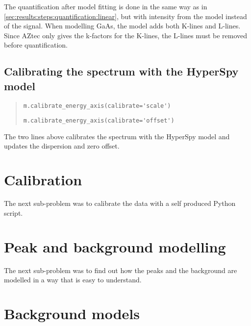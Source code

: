 The quantification after model fitting is done in the same way as in \cref{sec:results:steps:quantification:linear}, but with intensity from the model instead of the signal.
When modelling GaAs, the model adds both K-lines and L-lines.
Since AZtec only gives the k-factors for the K-lines, the L-lines must be removed before quantification.


\subsection{Calibrating the spectrum with the HyperSpy model}
\label{sec:results:steps:HyperSpycalibration}

\begin{quote}

    \verb|m.calibrate_energy_axis(calibrate='scale')|

    \verb|m.calibrate_energy_axis(calibrate='offset')|

\end{quote}

The two lines above calibrates the spectrum with the HyperSpy model and updates the dispersion and zero offset.
%
%
%

%
%
\section{Calibration}
\label{sec:results:calibration}

The next sub-problem was to calibrate the data with a self produced Python script.


%
%
\section{Peak and background modelling}
\label{sec:results:modelling}

The next sub-problem was to find out how the peaks and the background are modelled in a way that is easy to understand.

%
%
\section{Background models}
\label{sec:results:background}

